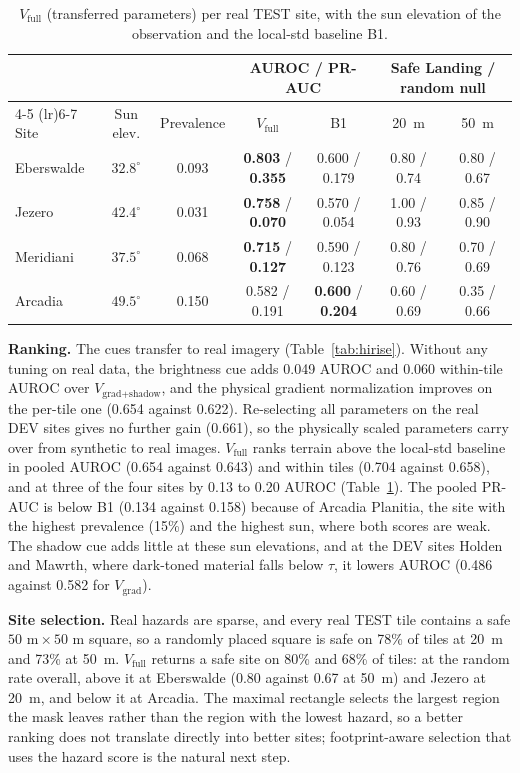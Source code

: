 \documentclass{article}
\begin{document}
\begin{table}[!htb]
  \caption{$V_{\text{full}}$ (transferred parameters) per real TEST site, with the sun elevation of the observation and the local-std baseline B1.}
  \label{tab:hirise_sites}
  \centering
  \small
  \setlength{\tabcolsep}{4pt}
  \begin{tabular}{lcccccc}
    \toprule
    & & & \multicolumn{2}{c}{AUROC / PR-AUC} & \multicolumn{2}{c}{Safe Landing / random null} \\
    \cmidrule(lr){4-5} \cmidrule(lr){6-7}
    Site & Sun elev. & Prevalence & $V_{\text{full}}$ & B1 & 20~m & 50~m \\
    \midrule
    Eberswalde & $32.8^\circ$ & 0.093 & \textbf{0.803} / \textbf{0.355} & 0.600 / 0.179 & 0.80 / 0.74 & 0.80 / 0.67 \\
    Jezero & $42.4^\circ$ & 0.031 & \textbf{0.758} / \textbf{0.070} & 0.570 / 0.054 & 1.00 / 0.93 & 0.85 / 0.90 \\
    Meridiani & $37.5^\circ$ & 0.068 & \textbf{0.715} / \textbf{0.127} & 0.590 / 0.123 & 0.80 / 0.76 & 0.70 / 0.69 \\
    Arcadia & $49.5^\circ$ & 0.150 & 0.582 / 0.191 & \textbf{0.600} / \textbf{0.204} & 0.60 / 0.69 & 0.35 / 0.66 \\
    \bottomrule
  \end{tabular}
\end{table}

\textbf{Ranking.} The cues transfer to real imagery (Table~\ref{tab:hirise}). Without any tuning on real data, the brightness cue adds 0.049 AUROC and 0.060 within-tile AUROC over $V_{\text{grad+shadow}}$, and the physical gradient normalization improves on the per-tile one (0.654 against 0.622). Re-selecting all parameters on the real DEV sites gives no further gain (0.661), so the physically scaled parameters carry over from synthetic to real images. $V_{\text{full}}$ ranks terrain above the local-std baseline in pooled AUROC (0.654 against 0.643) and within tiles (0.704 against 0.658), and at three of the four sites by 0.13 to 0.20 AUROC (Table~\ref{tab:hirise_sites}). The pooled PR-AUC is below B1 (0.134 against 0.158) because of Arcadia Planitia, the site with the highest prevalence (15\%) and the highest sun, where both scores are weak. The shadow cue adds little at these sun elevations, and at the DEV sites Holden and Mawrth, where dark-toned material falls below $\tau$, it lowers AUROC (0.486 against 0.582 for $V_{\text{grad}}$).

\textbf{Site selection.} Real hazards are sparse, and every real TEST tile contains a safe $50\text{ m} \times 50\text{ m}$ square, so a randomly placed square is safe on 78\% of tiles at 20~m and 73\% at 50~m. $V_{\text{full}}$ returns a safe site on 80\% and 68\% of tiles: at the random rate overall, above it at Eberswalde (0.80 against 0.67 at 50~m) and Jezero at 20~m, and below it at Arcadia. The maximal rectangle selects the largest region the mask leaves rather than the region with the lowest hazard, so a better ranking does not translate directly into better sites; footprint-aware selection that uses the hazard score is the natural next step.
\end{document}
